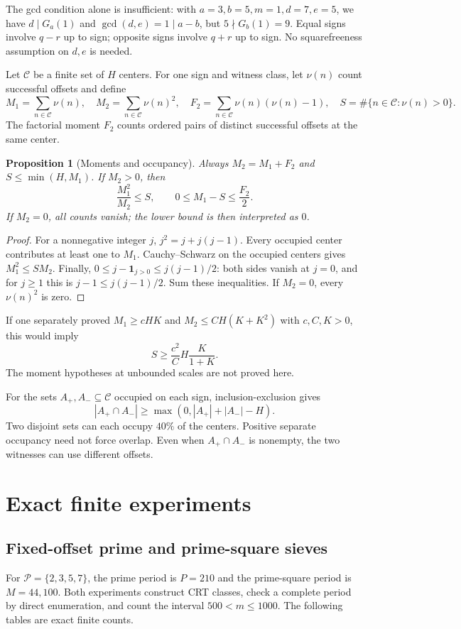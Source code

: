 \documentclass[11pt]{article}
\newtheorem{proposition}[theorem]{Proposition}
\theoremstyle{definition}
\theoremstyle{remark}
\newcommand{\Pset}{\mathcal P}
\newcommand{\ind}{\mathbf 1}
\begin{document}
The gcd condition alone is insufficient: with $a=3,b=5,m=1,d=7,e=5$,
we have $d\mid G_a(1)$ and $\gcd(d,e)=1\mid a-b$, but
$5\nmid G_b(1)=9$. Equal signs involve $q-r$ up to sign;
opposite signs involve $q+r$ up to sign. No squarefreeness
assumption on $d,e$ is needed.

Let $\mathcal C$ be a finite set of $H$ centers. For one sign and
witness class, let $\nu(n)$ count successful offsets and define
\[
 M_1=\sum_{n\in\mathcal C}\nu(n),\quad
 M_2=\sum_{n\in\mathcal C}\nu(n)^2,\quad
 F_2=\sum_{n\in\mathcal C}\nu(n)(\nu(n)-1),\quad
 S=\#\{n\in\mathcal C:\nu(n)>0\}.
\]
The factorial moment $F_2$ counts ordered pairs of distinct successful
offsets at the same center.

\begin{proposition}[Moments and occupancy]\label{prop:moments}
Always $M_2=M_1+F_2$ and $S\le\min(H,M_1)$. If $M_2>0$, then
\[
 \frac{M_1^2}{M_2}\le S,\qquad
 0\le M_1-S\le\frac{F_2}{2}.
\]
If $M_2=0$, all counts vanish; the lower bound is then interpreted as $0$.
\end{proposition}
\begin{proof}
For a nonnegative integer $j$, $j^2=j+j(j-1)$.
Every occupied center contributes at least one to $M_1$.
Cauchy--Schwarz on the occupied centers gives $M_1^2\le SM_2$.
Finally, $0\le j-\ind_{j>0}\le j(j-1)/2$: both sides vanish
at $j=0$, and for $j\ge1$ this is $j-1\le j(j-1)/2$.
Sum these inequalities. If $M_2=0$, every $\nu(n)^2$ is zero.
\end{proof}

If one separately proved $M_1\ge cHK$ and $M_2\le CH(K+K^2)$
with $c,C,K>0$, this would imply
\[
 S\ge\frac{c^2}{C}H\frac{K}{1+K}.
\]
The moment hypotheses at unbounded scales are not proved here.

For the sets $A_+,A_-\subseteq\mathcal C$ occupied on each sign,
inclusion-exclusion gives
\[
 |A_+\cap A_-|\ge\max(0,|A_+|+|A_-|-H).
\]
Two disjoint sets can each occupy $40\%$ of the centers.
Positive separate occupancy need not force overlap. Even when
$A_+\cap A_-$ is nonempty, the two witnesses can use different offsets.

\section{Exact finite experiments}
\subsection{Fixed-offset prime and prime-square sieves}
For $\Pset=\{2,3,5,7\}$, the prime period is $P=210$ and the
prime-square period is $M=44{,}100$. Both experiments construct
CRT classes, check a complete period by direct enumeration,
and count the interval $500<m\le1000$.
The following tables are exact finite counts.
\end{document}
